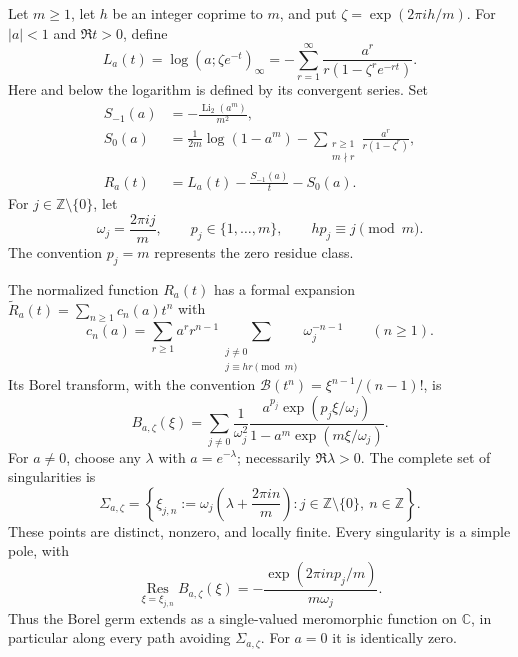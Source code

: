 Let $m\geq1$, let $h$ be an integer coprime to $m$, and put
$\zeta=\exp(2\pi i h/m)$.  For $|a|<1$ and $\Re t>0$, define
\begin{equation}
 L_a(t)=\log(a;\zeta e^{-t})_\infty
       =-\sum_{r=1}^{\infty}
          \frac{a^r}{r(1-\zeta^r e^{-rt})}.
 \label{eq:cb-log-definition}
\end{equation}
Here and below the logarithm is defined by its convergent series.  Set
\begin{align}
 S_{-1}(a)&=-\frac{\operatorname{Li}_2(a^m)}{m^2},\label{eq:cb-action}\\
 S_0(a)&=\frac{1}{2m}\log(1-a^m)
       -\sum_{\substack{r\geq1\\m\nmid r}}
          \frac{a^r}{r(1-\zeta^r)},\label{eq:cb-constant}\\
 R_a(t)&=L_a(t)-\frac{S_{-1}(a)}{t}-S_0(a).
 \label{eq:cb-normalization}
\end{align}
For $j\in\mathbb Z\setminus\{0\}$, let
\begin{equation}
 \omega_j=\frac{2\pi i j}{m},\qquad
 p_j\in\{1,\ldots,m\},\qquad hp_j\equiv j\pmod m.
 \label{eq:cb-indices}
\end{equation}
The convention $p_j=m$ represents the zero residue class.

\begin{theorem}
\label{thm:cyclotomic-borel}
The normalized function $R_a(t)$ has a formal expansion
$\widetilde R_a(t)=\sum_{n\geq1}c_n(a)t^n$ with
\begin{equation}
 c_n(a)=\sum_{r\geq1}a^r r^{n-1}
       \sum_{\substack{j\ne0\\j\equiv hr\pmod m}}
          \omega_j^{-n-1}\qquad(n\geq1).
 \label{eq:cb-coefficients}
\end{equation}
Its Borel transform, with the convention
$\mathcal B(t^n)=\xi^{n-1}/(n-1)!$, is
\begin{equation}
 B_{a,\zeta}(\xi)
 =\sum_{j\ne0}\frac{1}{\omega_j^2}
   \frac{a^{p_j}\exp(p_j\xi/\omega_j)}
        {1-a^m\exp(m\xi/\omega_j)}.
 \label{eq:cb-borel}
\end{equation}
For $a\ne0$, choose any $\lambda$ with $a=e^{-\lambda}$; necessarily
$\Re\lambda>0$.  The complete set of singularities is
\begin{equation}
 \Sigma_{a,\zeta}
 =\left\{\xi_{j,n}:=
       \omega_j\left(\lambda+\frac{2\pi i n}{m}\right):
       j\in\mathbb Z\setminus\{0\},\ n\in\mathbb Z\right\}.
 \label{eq:cb-poles}
\end{equation}
These points are distinct, nonzero, and locally finite.  Every singularity
is a simple pole, with
\begin{equation}
 \operatorname*{Res}_{\xi=\xi_{j,n}} B_{a,\zeta}(\xi)
 =-\frac{\exp(2\pi i n p_j/m)}{m\omega_j}.
 \label{eq:cb-residues}
\end{equation}
Thus the Borel germ extends as a single-valued meromorphic function on
$\mathbb C$, in particular along every path avoiding
$\Sigma_{a,\zeta}$.  For $a=0$ it is identically zero.
\end{theorem}

